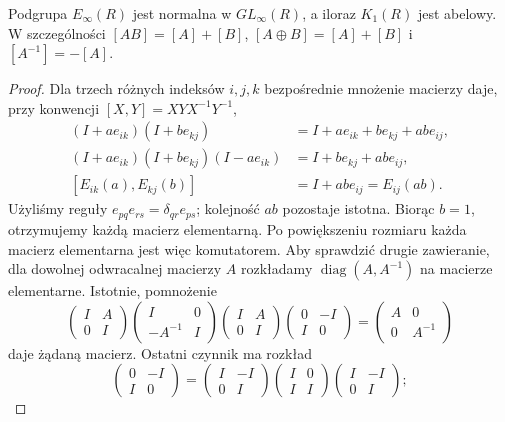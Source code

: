 \begin{stwierdzenie}
\label{prop:k1-abelowa-20}
Podgrupa $E_\infty(R)$ jest normalna w $GL_\infty(R)$,
a iloraz $K_1(R)$ jest abelowy. W szczególności
$[AB]=[A]+[B]$, $[A\oplus B]=[A]+[B]$ i
$[A^{-1}]=-[A]$.
\end{stwierdzenie}
\begin{proof}
Dla trzech różnych indeksów $i,j,k$ bezpośrednie
mnożenie macierzy daje, przy konwencji $[X,Y]=XYX^{-1}Y^{-1}$,
\[
 \begin{aligned}
 (I+ae_{ik})(I+be_{kj})&=I+ae_{ik}+be_{kj}+ab e_{ij},\\
 (I+ae_{ik})(I+be_{kj})(I-ae_{ik})&=I+be_{kj}+ab e_{ij},\\
 [E_{ik}(a),E_{kj}(b)]&=I+ab e_{ij}=E_{ij}(ab).
 \end{aligned}
\]
Użyliśmy reguły $e_{pq}e_{rs}=\delta_{qr}e_{ps}$;
kolejność $ab$ pozostaje istotna. Biorąc $b=1$,
otrzymujemy każdą macierz elementarną.
Po powiększeniu rozmiaru każda macierz elementarna
jest więc komutatorem. Aby sprawdzić drugie
zawieranie, dla dowolnej odwracalnej macierzy
$A$ rozkładamy $\operatorname{diag}(A,A^{-1})$
na macierze elementarne. Istotnie, pomnożenie
\[
 \begin{pmatrix}I&A\\0&I\end{pmatrix}
 \begin{pmatrix}I&0\\-A^{-1}&I\end{pmatrix}
 \begin{pmatrix}I&A\\0&I\end{pmatrix}
 \begin{pmatrix}0&-I\\I&0\end{pmatrix}
 =\begin{pmatrix}A&0\\0&A^{-1}\end{pmatrix}
\]
daje żądaną macierz. Ostatni czynnik ma rozkład
\[
 \begin{pmatrix}0&-I\\I&0\end{pmatrix}
 =\begin{pmatrix}I&-I\\0&I\end{pmatrix}
  \begin{pmatrix}I&0\\I&I\end{pmatrix}
  \begin{pmatrix}I&-I\\0&I\end{pmatrix};
\]
\end{proof}

